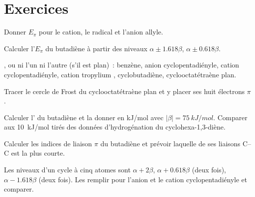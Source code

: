 \section{Exercices}

\begin{exercise}[$\star$]\label{exo:b2:huckel:1}
Donner $E_\pi$ pour le cation, le radical et l'anion allyle.
\end{exercise}

\begin{exercise}[$\star$]\label{exo:b2:huckel:2}
Calculer l'$E_\pi$ du butadiène à partir des niveaux $\alpha \pm 1.618\beta$, $\alpha \pm 0.618\beta$.
\end{exercise}

\begin{exercise}[$\star$]\label{exo:b2:huckel:3}
,  ou ni l'un ni l'autre (s'il est plan)~: benzène, anion cyclopentadiényle,
cation cyclopentadiényle, cation tropylium , cyclobutadiène, cyclooctatétraène
plan.
\end{exercise}

\begin{exercise}[$\star$]\label{exo:b2:huckel:4}
Tracer le cercle de Frost du cyclooctatétraène plan et y placer ses huit électrons $\pi$.
\end{exercise}

\begin{exercise}[$\star\star$]\label{exo:b2:huckel:5}
Calculer l' du butadiène et la donner en \unit{kJ/mol} avec
$|\beta| = \qty{75}{kJ/mol}$. Comparer aux \qty{10}{kJ/mol} tirés des données d'hydrogénation
du cyclohexa-1,3-diène.
\end{exercise}

\begin{exercise}[$\star\star$]\label{exo:b2:huckel:6}
Calculer les indices de liaison $\pi$ du butadiène et prévoir laquelle de ses liaisons C--C est la
plus courte.
\end{exercise}

\begin{exercise}[$\star\star$]\label{exo:b2:huckel:7}
Les niveaux d'un cycle à cinq atomes sont $\alpha + 2\beta$, $\alpha + 0.618\beta$ (deux fois),
$\alpha - 1.618\beta$ (deux fois). Les remplir pour l'anion et le cation cyclopentadiényle et
comparer.
\end{exercise}

